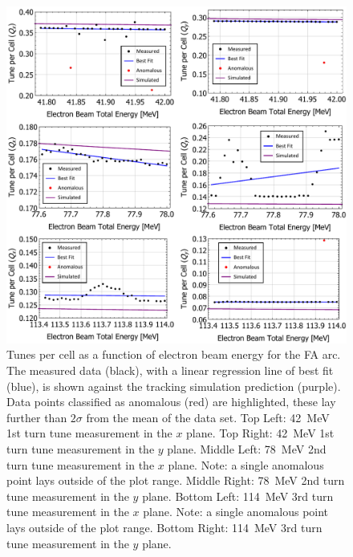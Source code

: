 \documentclass[../main.tex]{subfiles}
\begin{document}
\begin{figure}[!h]
\centering
\includegraphics[width=\textwidth]{Figures/CBETA_Multi-Pass_Commissioning/chromaticity/FA_analysed_3turn_tunes.pdf}
\caption{Tunes per cell as a function of electron beam energy for the FA arc. The measured data (black), with a linear regression line of best fit (blue), is shown against the tracking simulation prediction (purple). Data points classified as anomalous (red) are highlighted, these lay further than $2\sigma$ from the mean of the data set. Top Left: 42~\si{\mega\electronvolt} 1st turn tune measurement in the $x$ plane. Top Right: 42~\si{\mega\electronvolt} 1st turn tune measurement in the $y$ plane. Middle Left: 78~\si{\mega\electronvolt} 2nd turn tune measurement in the $x$ plane. Note: a single anomalous point lays outside of the plot range. Middle Right: 78~\si{\mega\electronvolt} 2nd turn tune measurement in the $y$ plane. Bottom Left:  114~\si{\mega\electronvolt} 3rd turn tune measurement in the $x$ plane. Note: a single anomalous point lays outside of the plot range. Bottom Right: 114~\si{\mega\electronvolt} 3rd turn tune measurement in the $y$ plane.}
\label{fig:FA_analysed_tunes}
\end{figure}
\end{document}
